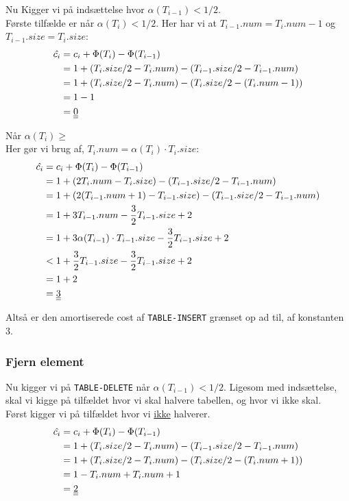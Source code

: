 Nu Kigger vi på indsættelse hvor $\alpha(T_{i-1}) < 1/2$.\\
Første tilfælde er når $\alpha(T_i) < 1/2$. Her har vi at $T_{i-1}.num = T_i.num - 1$ og $T_{i-1}.size = T_i.size$:
\begin{align*}
  \hat{c_i} &= c_i + \Phi(T_i) - \Phi(T_{i-1})\\
            &= 1 + (T_i.size/2 - T_i.num) - (T_{i-1}.size/2 - T_{i-1}.num)\\
            &= 1 + (T_i.size/2 - T_i.num) - (T_i.size/2 - (T_i.num - 1))\\
            &= 1 - 1\\
            &= \underline{\underline{0}}
\end{align*}

Når $\alpha(T_i) \geq$\\
Her gør vi brug af, $T_i.num = \alpha(T_i) \cdot T_i.size$:
\begin{align*}
  \hat{c_i} &= c_i + \Phi(T_i) - \Phi(T_{i-1})\\
            &= 1 + (2T_i.num - T_i.size) - (T_{i-1}.size/2 - T_{i-1}.num)\\
            &= 1 + (2(T_{i-1}.num + 1) - T_{i-1}.size) - (T_{i-1}.size/2 - T_{i-1}.num)\\
            &= 1 + 3T_{i-1}.num - \frac{3}{2}T_{i-1}.size + 2\\
            &= 1 + 3\alpha(T_{i-1})\cdot T_{i-1}.size - \frac{3}{2}T_{i-1}.size + 2\\
            &< 1 + \frac{3}{2}T_{i-1}.size - \frac{3}{2}T_{i-1}.size + 2\\
            &= 1 + 2\\
            &= \underline{\underline{3}}
\end{align*}

Altså er den amortiserede cost af \texttt{TABLE-INSERT} grænset op ad til, af konstanten 3.

\subsubsection{Fjern element}
Nu kigger vi på \texttt{TABLE-DELETE} når $\alpha(T_{i-1}) < 1/2$. Ligesom med indsættelse, skal vi kigge på tilfældet hvor vi skal halvere tabellen, og hvor vi ikke skal.\\

Først kigger vi på tilfældet hvor vi \underline{ikke} halverer.
\begin{align*}
  \hat{c_i} &= c_i + \Phi(T_i) - \Phi(T_{i-1})\\
            &= 1 + (T_i.size/2 - T_i.num) - (T_{i-1}.size/2 - T_{i-1}.num)\\
            &= 1 + (T_i.size/2 - T_i.num) - (T_i.size/2 - (T_i.num + 1))\\
            &= 1 - T_i.num + T_i.num + 1\\
            &= \underline{\underline{2}}
\end{align*}

